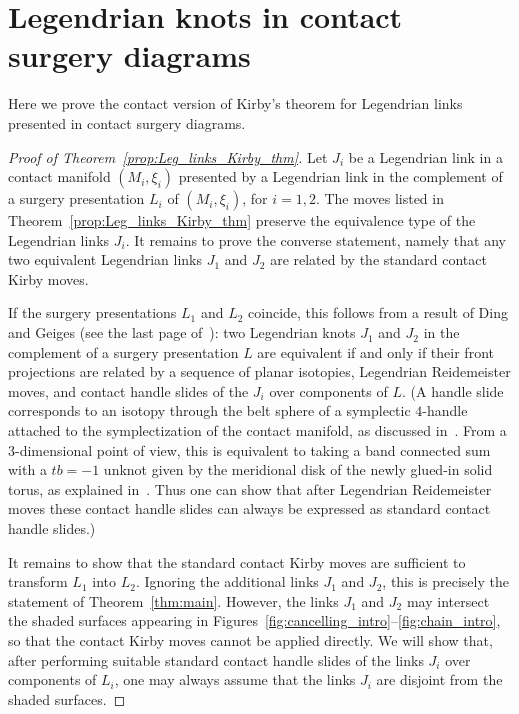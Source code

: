 \documentclass{amsart}
\numberwithin{equation}{section}
\numberwithin{figure}{section}
\theoremstyle{definition}
\theoremstyle{remark}
\let\olddxi\xi %
\renewcommand{\xi}{\olddxi}
\begin{document}

\section{Legendrian knots in contact surgery diagrams}\label{sec:proofLeg_links_Kirby_thm}

Here we prove the contact version of Kirby's theorem for Legendrian links presented in contact surgery diagrams.

\begin{proof}[Proof of Theorem~\ref{prop:Leg_links_Kirby_thm}]
Let $J_i$ be a Legendrian link in a contact manifold $(M_i,\xi_i)$ presented by a Legendrian link in the complement of a surgery presentation $L_i$ of $(M_i,\xi_i)$, for $i=1,2$. The moves listed in Theorem~\ref{prop:Leg_links_Kirby_thm} preserve the equivalence type of the Legendrian links $J_i$. It remains to prove the converse statement, namely that any two equivalent Legendrian links $J_1$ and $J_2$ are related by the standard contact Kirby moves.

If the surgery presentations $L_1$ and $L_2$ coincide, this follows from a result of Ding and Geiges (see the last page of~\cite{Ding_Geiges_slides}): two Legendrian knots $J_1$ and $J_2$ in the complement of a surgery presentation $L$ are equivalent if and only if their front projections are related by a sequence of planar isotopies, Legendrian Reidemeister moves, and contact handle slides of the $J_i$ over components of $L$. (A handle slide corresponds to an isotopy through the belt sphere of a symplectic $4$-handle attached to the symplectization of the contact manifold, as discussed in~\cite{Ding_Geiges_slides}. From a 3-dimensional point of view, this is equivalent to taking a band connected sum with a $tb=-1$ unknot given by the meridional disk of the newly glued-in solid torus, as explained in~\cite{Casals_Etnyre_Kegel}. Thus one can show that after Legendrian Reidemeister moves these contact handle slides can always be expressed as standard contact handle slides.)

It remains to show that the standard contact Kirby moves are sufficient to transform $L_1$ into $L_2$. Ignoring the additional links $J_1$ and $J_2$, this is precisely the statement of Theorem~\ref{thm:main}. However, the links $J_1$ and $J_2$ may intersect the shaded surfaces appearing in Figures~\ref{fig:cancelling_intro}--\ref{fig:chain_intro}, so that the contact Kirby moves cannot be applied directly. We will show that, after performing suitable standard contact handle slides of the links $J_i$ over components of $L_i$, one may always assume that the links $J_i$ are disjoint from the shaded surfaces.


\end{proof}
\end{document}
